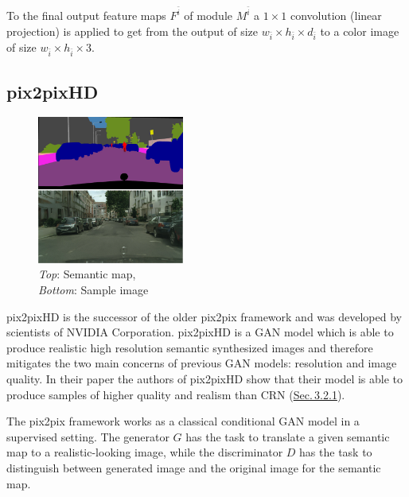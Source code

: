 To the final output feature maps $F^{\bar{i}}$ of module $M^{\bar{i}}$ a $1\times1$ convolution (linear projection) is applied to get from the output of size $w_{\bar{i}}\times h_{\bar{i}}\times d_{\bar{i}}$ to a color image of size $w_{\bar{i}}\times h_{\bar{i}}\times3$.

\subsection{pix2pixHD} \label{sec:3.2.2}
%
\begin{figure}
    \begin{center}
        \includegraphics[width=0.43\textwidth]{Chapters/figures/pix2pixHD_example.PNG}
    \end{center}
    \caption[]{\textit{Top}: Semantic map, \\\textit{Bottom}: Sample image}
\end{figure}
%
pix2pixHD \cite{pix2pixHD} is the successor of the older pix2pix \cite{pix2pix} framework and was developed by scientists of NVIDIA Corporation. pix2pixHD is a GAN model which is able to produce realistic high resolution semantic synthesized images and therefore mitigates the two main concerns of previous GAN models: resolution and image quality. In their paper the authors of pix2pixHD show that their model is able to produce samples of higher quality and realism than CRN (\hyperref[sec:3.2.1]{Sec.\,3.2.1}).

The pix2pix framework works as a classical conditional GAN model in a supervised setting. The generator $G$ has the task to translate a given semantic map to a realistic-looking image, while the discriminator $D$ has the task to distinguish between generated image and the original image for the semantic map.

